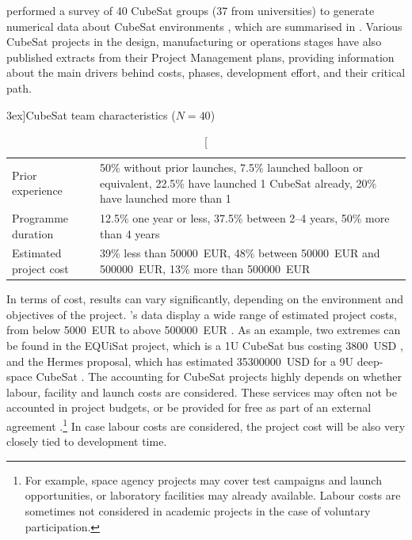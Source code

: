 \documentclass[a4paper,nobib,justified,final]{tufte-book}
\begin{document}
\citeauthor{berthoudHowSetCubeSat2016} performed a survey of 40 CubeSat groups (37 from universities) to generate numerical data about CubeSat environments \autocite{berthoudHowSetCubeSat2016}, which are summarised in . Various CubeSat projects in the design, manufacturing or operations stages have also published extracts from their Project Management plans, providing information about the main drivers behind costs, phases, development effort, and their critical path.

\begin{table}
	\caption[CubeSat team characteristics][3ex]{CubeSat team characteristics (\(N = 40\)) \cite{berthoudHowSetCubeSat2016}}
	\label{tab:l_cubesat_team_characteristics}
	\def\arraystretch{1.1}
	\begin{tabularx}{\linewidth}{@{}lX@{}}
		\toprule
		Prior experience &
		50\% without prior launches, 7.5\% launched balloon or equivalent, 22.5\% have launched 1 CubeSat already, 20\% have launched more than 1 \\
		Programme duration &
		12.5\% one year or less, 37.5\% between 2--4 years,
		50\% more than 4 years\\
		Estimated project cost & 39\% less than \qty{50000}{EUR}, 48\% between \qty{50000}{EUR} and \qty{500000}{EUR}, 13\% more than \qty{500000}{EUR} \\
		\bottomrule
	\end{tabularx}
\end{table}



\vspace{3ex}%
In terms of cost, results can vary significantly, depending on the environment and objectives of the project.
\citeauthor{berthoudHowSetCubeSat2016}'s data display a wide range of estimated project costs, from below \qty{5000}{EUR} to above \qty{500000}{EUR} \cite{berthoudHowSetCubeSat2016}. As an example, two extremes can be found in the EQUiSat project, which is a 1U CubeSat bus costing \SI{3800}{USD} \autocite{equisat}, and the Hermes proposal, which has estimated \SI{35300000}{USD} for a 9U deep-space CubeSat \autocite{pujolgasullaHermesCubesatOnsite2021}. The accounting for CubeSat projects highly depends on whether labour, facility and launch costs are considered. These services may often not be accounted in project budgets, or be provided for free as part of an external agreement \autocite{gambleMetricsSpacecraftDesign2012}.\footnote{For example, space agency projects may cover test campaigns and launch opportunities, or laboratory facilities may already available. Labour costs are sometimes not considered in academic projects in the case of voluntary participation.} In case labour costs are considered, the project cost will be also very closely tied to development time.
\end{document}
